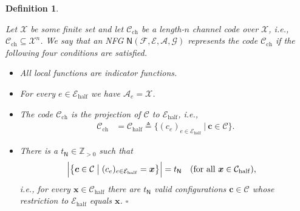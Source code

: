 \documentclass[journal, twocolumn]{IEEEtran}
\renewcommand{\mathbf}[1]{{\bm{#1}}}
\newcommand{\ie}{\emph{i.e.}}
\newcommand{\Z}{\mathbb{Z}}
\newcommand{\Zpp}{\Z_{>0}}
\newcommand{\vect}[1]{\mathbf{#1}}
\newcommand{\code}[1]{\mathcal{#1}}
\newcommand{\set}[1]{\mathcal{#1}}
\newcommand{\graph}[1]{\mathsf{#1}}
\newcommand{\defeq}{\triangleq}
\newcommand{\codeCchannel}{\code{C}_{\mathrm{ch}}}
\newcommand{\codeCedge}{\code{C}}
\newcommand{\codeCedgehalf}{\code{C}_{\mathrm{half}}}
\newcommand{\setA}{\set{A}}
\newcommand{\setE}{\set{E}}
\newcommand{\setEhalf}{\set{E}_{\mathrm{half}}}
\newcommand{\setF}{\set{F}}
\newcommand{\setG}{\set{G}}
\newcommand{\setX}{\set{X}}
\newcommand{\vc}{\vect{c}}
\newcommand{\vx}{\vect{x}}
\newcommand{\graphN}{\graph{N}}
\newcommand{\?}{\mathrm{?}}
\newcommand{\qedwhite}{\hspace*{\fill}%
  $\square$\smallskip}
\newcommand{\defend}{\qedwhite}
\newtheorem{Definition}[Lemma]{Definition}
\begin{document}
\begin{Definition}
  \label{def:normal:factor:graph:representing:a:code:1}
  
  Let $\setX$ be some finite set and let $\codeCchannel$ be a length-$n$
  channel code over $\setX$, \ie, $\codeCchannel \subseteq \setX^n$. We say
  that an NFG $\graphN(\setF,\setE, \setA, \setG)$ represents the code
  $\codeCchannel$ if the following four conditions are satisfied.
  \begin{itemize}
  
  \item All local functions are indicator functions.

  \item For every $e \in \setEhalf$ we have $\setA_e = \setX$.

  \item The code $\codeCchannel$ is the projection of $\codeCedge$ to
    $\setEhalf$, \ie,
    \begin{align*}
      \codeCchannel
        &= \codeCedgehalf
         \defeq
           \big\{ 
             (c_e)_{e \in \setEhalf}
           \ \big| \ 
             \vc \in \codeCedge
           \big\}.
    \end{align*}
  
  \item There is a $t_{\graphN} \in \Zpp$ such that
    \begin{align*}
      \Big|
        \bigl\{
          \vc \in \codeCedge
          \bigm|
          (c_e)_{e \in \setEhalf} = \vx
        \bigr\}
      \Big|
        &= t_{\graphN}
             \quad \text{(for all $\vx \in \codeCedgehalf$)},
    \end{align*}
    \ie, for every $\vx \in \codeCedgehalf$ there are $t_{\graphN}$ valid
    configurations $\vc \in \codeCedge$ whose restriction to $\setEhalf$
    equals $\vx$. \defend

  \end{itemize}
\end{Definition}
\end{document}
